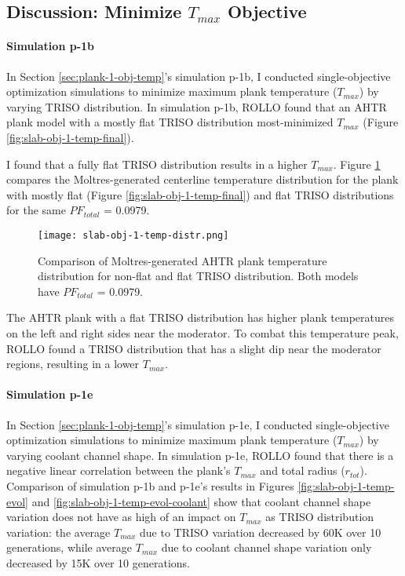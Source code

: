 \subsection{Discussion: Minimize $T_{max}$ Objective}
\label{sec:plank-discussion-temp}
\paragraph{Simulation p-1b}
In Section \ref{sec:plank-1-obj-temp}'s simulation p-1b, I conducted single-objective 
optimization simulations to minimize maximum plank temperature ($T_{max}$) by varying 
TRISO distribution. 
In simulation p-1b, \gls{ROLLO} found that an \gls{AHTR} plank model with a mostly 
flat TRISO distribution most-minimized $T_{max}$ 
(Figure \ref{fig:slab-obj-1-temp-final}).

I found that a fully flat \gls{TRISO} distribution results in a higher $T_{max}$.
Figure \ref{fig:slab-obj-1-temp-distr} compares the Moltres-generated centerline 
temperature distribution for the plank with mostly flat (Figure 
\ref{fig:slab-obj-1-temp-final}) and flat TRISO distributions for the same 
$PF_{total}$ = 0.0979. 
\begin{figure}[htbp!]
    \centering
    \texttt{[image: slab-obj-1-temp-distr.png]}
    \caption{Comparison of Moltres-generated AHTR plank temperature distribution for 
    non-flat and flat TRISO distribution. 
    Both models have $PF_{total}$ = 0.0979.}
    \label{fig:slab-obj-1-temp-distr}
\end{figure}
The \gls{AHTR} plank with a flat \gls{TRISO} distribution has higher plank temperatures 
on the left and right sides near the moderator. 
To combat this temperature peak, ROLLO found a \gls{TRISO} distribution that 
has a slight dip near the moderator regions, resulting in a lower $T_{max}$.

\paragraph{Simulation p-1e}
In Section \ref{sec:plank-1-obj-temp}'s simulation p-1e, I conducted single-objective 
optimization simulations to minimize maximum plank temperature ($T_{max}$) by varying 
coolant channel shape. 
In simulation p-1e, \gls{ROLLO} found that there is a negative linear correlation 
between the plank's $T_{max}$ and total radius ($r_{tot}$). 
Comparison of simulation p-1b and p-1e's results in 
Figures \ref{fig:slab-obj-1-temp-evol} and \ref{fig:slab-obj-1-temp-evol-coolant} 
show that coolant channel shape variation does not have as high of an impact on 
$T_{max}$ as \gls{TRISO} distribution variation: the average $T_{max}$ due to 
\gls{TRISO} variation decreased by 60K over 10 generations, while average $T_{max}$ due 
to coolant channel shape variation only decreased by 15K over 10 generations. 


